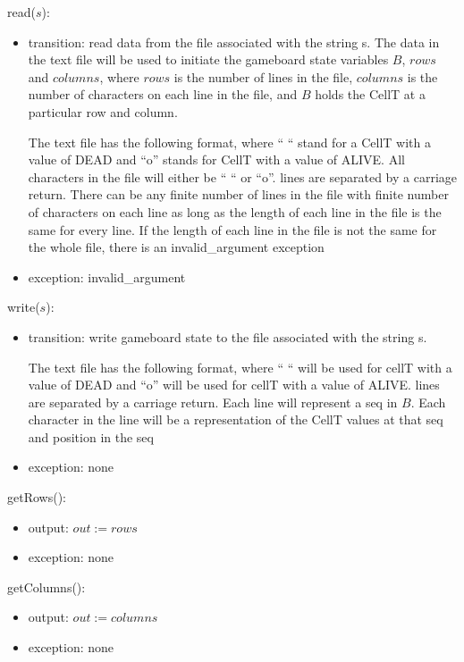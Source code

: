 \documentclass[12pt]{article}
\begin{document}
\noindent read($s$):

\begin{itemize}
\item transition: read data from the file  associated with the string s.
  The data in the text file will be used to initiate the gameboard state variables $B$, $rows$ and $columns$, where $rows$ is the number of lines in the file, $columns$ is the number of characters on each line in the file, and $B$ holds the CellT at a particular row and column.

  The text file has the following format, where `` `` stand for a CellT with a value of DEAD  and ``o'' stands for CellT with a value of ALIVE. All characters in the file will either be `` `` or  ``o''. lines are separated by a carriage return.  There can be any finite number of lines in the file with finite number of characters on each line as long as the length of each line in the file is the same for every line.  If the length of each line in the file is not the same for the whole file, there is an invalid\_argument exception

\item exception: invalid\_argument
\end{itemize}

\noindent write($s$):

\begin{itemize}
\item transition: write gameboard state to the file  associated with the string s.


  The text file has the following format, where `` `` will be used for cellT with a value of DEAD and ``o'' will be used for cellT with a value of ALIVE. lines are separated by a carriage return. Each line will represent a seq in $B$. Each character in the line will be a representation of the CellT values at that seq and position in the seq


\item exception: none
\end{itemize}


\noindent getRows():
\begin{itemize}
\item output: $out := rows$
\item exception: none
\end{itemize}

\noindent getColumns():
\begin{itemize}
\item output: $out := columns$
\item exception: none
\end{itemize}
\end{document}
